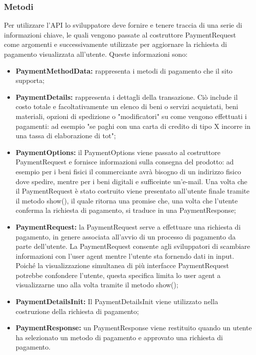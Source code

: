 \documentclass[11pt ,a4paper , twoside , openright ]{article}
\begin{document}
\subsubsection{Metodi \cite{rif1}}
Per utilizzare l'API lo sviluppatore deve fornire e tenere traccia di una serie di informazioni chiave, le quali vengono passate al costruttore PaymentRequest come argomenti e successivamente utilizzate per aggiornare la richiesta di pagamento visualizzata all'utente. Queste informazioni sono:
\begin{itemize}
	\item \textbf{PaymentMethodData:} rappresenta i metodi di pagamento che il sito supporta;
	\item \textbf{PaymentDetails:} rappresenta i dettagli della transazione. Ciò include il costo totale e facoltativamente un elenco di beni o servizi acquistati, beni materiali, opzioni di spedizione o "modificatori" su come vengono effettuati i pagamenti: ad esempio "se paghi con una carta di credito di tipo X incorre in una tassa di elaborazione di tot";
	\item \textbf{PaymentOptions:} il PaymentOptions viene passato al costruttore PaymentRequest e fornisce informazioni sulla consegna del prodotto: ad esempio per i beni fisici il commerciante avrà bisogno di un indirizzo fisico dove spedire, mentre per i beni digitali e sufficeinte un'e-mail. Una volta che il PaymentRequest è stato costruito viene presentato all'utente finale tramite il metodo show(), il quale ritorna una promise che, una volta che l'utente conferma la richiesta di pagamento, si traduce in una PaymentResponse;
	\item \textbf{PaymentRequest:} la PaymentRequest serve a effettuare una richiesta di pagamento, in genere associata all'avvio di un processo di pagamento da parte dell'utente. La PaymentRequest consente agli sviluppatori di scambiare informazioni con l'user agent mentre l'utente sta fornendo dati in input. Poiché la visualizzazione simultanea di più interfacce PaymentRequest potrebbe confondere l'utente, questa specifica limita lo user agent a visualizzarne uno alla volta tramite il metodo show();
	\item \textbf{PaymentDetailsInit:} Il PaymentDetailsInit viene utilizzato nella costruzione della richiesta di pagamento;
	\item \textbf{PaymentResponse:} un PaymentResponse viene restituito quando un utente ha selezionato un metodo di pagamento e approvato una richiesta di pagamento.
\end{itemize}
\end{document}
